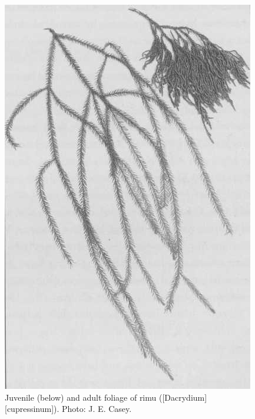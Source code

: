 \begin{figure}[!htb]
	\centering
	\begin{minipage}[t]{0.493\textwidth}
		\centering
		\includegraphics[width=\textwidth]{graphics/figure21rimu.jpg}
    	\caption[Rimu foliage]{Juvenile (below) and adult foliage of rimu ([Dacrydium][cupressinum]).
    	Photo: J. E. Casey.}%
    	\label{fig:21rimu}
	\end{minipage}\hfill%
	\begin{minipage}[t]{0.487\textwidth}
    	\centering

\end{minipage}
\end{figure}
